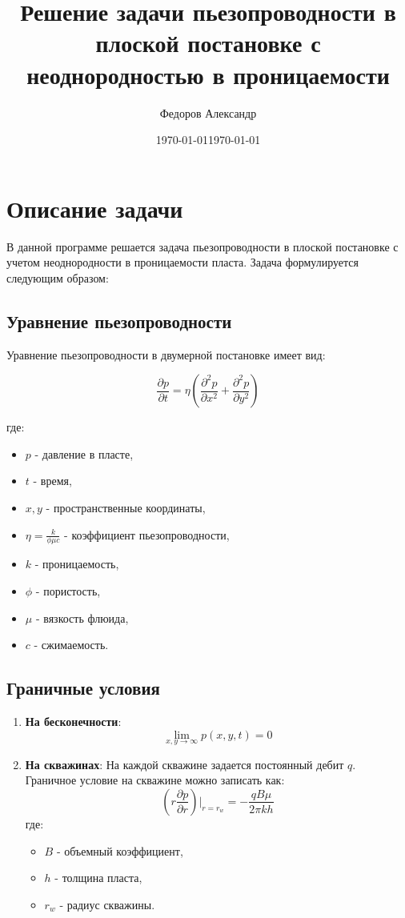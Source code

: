\documentclass{article}
\date{\today}
\title{Решение задачи пьезопроводности в плоской постановке с неоднородностью в проницаемости}
\author{Федоров Александр}
\date{\today}
\begin{document}
\maketitle

\section{Описание задачи}

В данной программе решается задача пьезопроводности в плоской постановке с учетом неоднородности в проницаемости пласта. Задача формулируется следующим образом:

\subsection{Уравнение пьезопроводности}

Уравнение пьезопроводности в двумерной постановке имеет вид:

\[
\frac{\partial p}{\partial t} = \eta \left( \frac{\partial^2 p}{\partial x^2} + \frac{\partial^2 p}{\partial y^2} \right)
\]

где:
\begin{itemize}
    \item \( p \) - давление в пласте,
    \item \( t \) - время,
    \item \( x, y \) - пространственные координаты,
    \item \( \eta = \frac{k}{\phi \mu c} \) - коэффициент пьезопроводности,
    \item \( k \) - проницаемость,
    \item \( \phi \) - пористость,
    \item \( \mu \) - вязкость флюида,
    \item \( c \) - сжимаемость.
\end{itemize}

\subsection{Граничные условия}

\begin{enumerate}
    \item \textbf{На бесконечности}:
    \[
    \lim_{x, y \to \infty} p(x, y, t) = 0
    \]

    \item \textbf{На скважинах}:
    На каждой скважине задается постоянный дебит \( q \). Граничное условие на скважине можно записать как:
    \[
    \left( r \frac{\partial p}{\partial r} \right) \bigg|_{r = r_w} = - \frac{qB\mu}{2\pi k h}
    \]
    где:
    \begin{itemize}
        \item \( B \) - объемный коэффициент,
        \item \( h \) - толщина пласта,
        \item \( r_w \) - радиус скважины.
    \end{itemize}
\end{enumerate}
\end{document}

